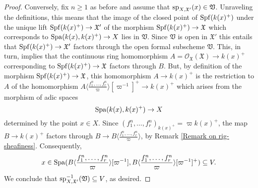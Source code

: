 \documentclass[12pt,twoside,a4paper]{article}
\theoremstyle{definition}
\theoremstyle{remark}
\newcommand\spc{{\rm sp}}
\newcommand\Spa{{\rm Spa}}
\newcommand\Spf{{\rm Spf}}
\begin{document}
\begin{proof}
Conversely, fix $n\geq1$ as before and assume that $\spc_{X,\mathfrak{X}'}(x)\in \mathfrak{V}$. Unraveling the definitions, this means that the image of the closed point of $\Spf(k(x)^{+})$ under the unique lift $\Spf(k(x)^{+})\to \mathfrak{X}'$ of the morphism $\Spf(k(x)^{+})\to \mathfrak{X}$ which corresponds to $\Spa(k(x), k(x)^{+})\to X$ lies in $\mathfrak{V}$. Since $\mathfrak{V}$ is open in $\mathfrak{X}'$ this entails that $\Spf(k(x)^{+})\to \mathfrak{X}'$ factors through the open formal subscheme $\mathfrak{V}$. This, in turn, implies that the continuous ring homomorphism $A=\mathcal{O}_{\mathfrak{X}}(\mathfrak{X})\to k(x)^{+}$ corresponding to $\Spf(k(x)^{+})\to \mathfrak{X}$ factors through $B$. But, by definition of the morphism $\Spf(k(x)^{+})\to \mathfrak{X}$, this homomorphism $A\to k(x)^{+}$ is the restriction to $A$ of the homomorphism $A\langle\frac{f_1^{n},\dots,f_r^{n}}{\varpi}\rangle[\varpi^{-1}]^{+}\to k(x)^{+}$ which arises from the morphism of adic spaces \begin{equation*}\Spa(k(x), k(x)^{+})\to X\end{equation*}determined by the point $x\in X$. Since $(f_1^{n},\dots, f_{r}^{n})_{k(x)^{+}}=\varpi k(x)^{+}$, the map $B\to k(x)^{+}$ factors through $B\to B\langle\frac{f_1^{n},\dots,f_r^{n}}{\varpi}\rangle$, by Remark \ref{Remark on rig-sheafiness}. Consequently, \begin{equation*}x\in\Spa(B\langle\frac{f_1^{n},\dots,f_r^{n}}{\varpi}\rangle[\varpi^{-1}], B\langle\frac{f_1^{n},\dots,f_r^{n}}{\varpi}\rangle[\varpi^{-1}]^{+})\subseteq V.\end{equation*}We conclude that $\spc_{X,\mathfrak{X}'}^{-1}(\mathfrak{V})\subseteq V$, as desired.


\end{proof}
\end{document}
